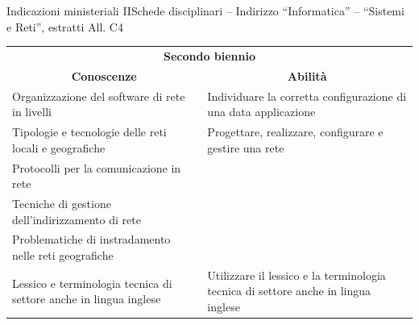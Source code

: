 \documentclass[italian]{beamer}
\newcommand{\blu}[1]{{\usebeamercolor[fg]{structure} #1}}
\newcommand\mybullet{\leavevmode%
\blu{\usebeamertemplate{itemize item}}\hspace{.5em}}
\begin{document}
\begin{frame}{Indicazioni ministeriali II}{Schede disciplinari -- Indirizzo ``Informatica'' -- ``Sistemi e Reti'', estratti All. C4}
		
		\centering
		\begin{tabular}{p{0.49\dimexpr \linewidth-2\tabcolsep}p{0.49\dimexpr \linewidth-2\tabcolsep}}
		\toprule
		\multicolumn{2}{c}{\bf Secondo biennio}\\
		\multicolumn{1}{c}{\bf Conoscenze} & \multicolumn{1}{c}{\bf Abilit\`a}\\
		\midrule
			\mybullet \alert{Organizzazione del software di rete in livelli} & \mybullet Individuare la corretta \alert{configurazione di una data applicazione}\\
			\mybullet Tipologie  e \alert{tecnologie delle reti locali e geografiche} & \mybullet Progettare, realizzare, configurare e gestire una rete\\
			\mybullet \alert{Protocolli per la comunicazione in rete}\\
			\mybullet \alert{Tecniche di gestione dell'indirizzamento di rete}\\
			\mybullet \alert{Problematiche di instradamento nelle reti geografiche}\\
			\mybullet \alert{Lessico e terminologia tecnica di settore} anche in lingua inglese & \mybullet \alert{Utilizzare il lessico e la terminologia tecnica di settore} anche in lingua inglese\\
		\bottomrule
		\end{tabular}
		
	\note{%

	}%
\end{frame}

		
		
		
		
		
\end{document}
